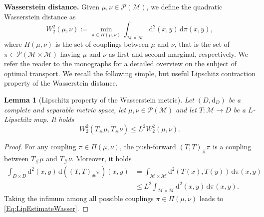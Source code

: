 \documentclass[11pt,a4paper,oneside]{amsart}
\numberwithin{equation}{section}
\newtheorem{lemma}[theorem]{Lemma}
\newcommand{\dd}{\mathrm{d}}
\DeclareMathOperator*{\Lip}{Lip}
\begin{document}
\medskip
\noindent
\textbf{Wasserstein distance. }Given $\mu, \nu\in\mathcal{P}(\mathcal{M})$, we define the quadratic Wasserstein distance as
%
\begin{equation}\label{Wasserstein}
%
W_2^2(\mu, \nu):= \min_{\pi \in \Pi(\mu, \nu)} \int_{\mathcal{M}\times \mathcal{M}} \dd^2(x,y) \,\dd \pi (x,y),
%
\end{equation}
%
where $\Pi(\mu, \nu)$ is the set of couplings between $\mu$ and $\nu$, that is the set of $\pi\in\mathcal{P}(\mathcal{M}\times \mathcal{M})$ having $\mu$ and $\nu$ as first and second marginal, respectively. We refer the reader to the monographs \cite{Viltop, OldNewVillani} for a detailed overview on the subject of optimal transport. %
%
%
%
%
%
%
%
%
%
We recall the following simple, but useful Lipschitz contraction property of the Wasserstein distance. 
\begin{lemma}[Lipschitz property of the Wasserstein metric] \label{lem:transportcontraction}
Let $(D, \dd_D)$ be a complete and separable metric space, let $\mu, \nu\in\mathcal{P}(\mathcal{M})$ and let $T: \mathcal{M} \rightarrow D$ be a $L$-Lipschitz map. It holds
%
\begin{equation}\label{Eq:LipEstimateWasser}
W_2^2 (T_{\#}\mu,T_{\#} \nu) \le L^2 W_2^2 (\mu, \nu).
\end{equation}
%
\end{lemma}
\begin{proof}
For any coupling $\pi \in \Pi(\mu, \nu)$, the push-forward $(T,T)_\# \pi$ is a coupling between $T_\# \mu$ and $T_\# \nu$. Moreover, it holds
\[
\begin{split}
\int_{D\times D} \dd^2(x,y) \,\dd ((T,T)_\#\pi)(x,y) & = \int_{\mathcal{M}\times\mathcal{M}} \dd^2(T(x),T(y))\, \dd \pi(x,y)\\
&\le L^2 \int_{\mathcal{M}\times\mathcal{M}} \dd^2(x,y) \, \dd \pi(x,y).
\end{split}
\]
Taking the infimum among all possible couplings $\pi \in \Pi(\mu,\nu)$ leads to \eqref{Eq:LipEstimateWasser}.
\end{proof}
\end{document}
